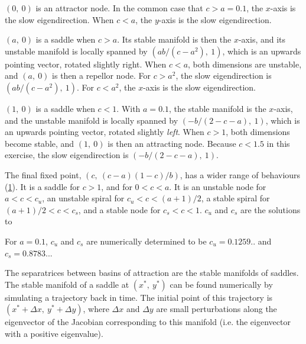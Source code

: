 $(0,\ 0)$ is an attractor node. In the common case that $c > a = 0.1$, the $x$-axis is the slow eigendirection. When $c < a$, the $y$-axis is the slow eigendirection.

$(a,\ 0)$ is a saddle when $c > a$. Its stable manifold is then the $x$-axis, and its unstable manifold is locally spanned by $(ab/(c-a^2),\ 1)$, which is an upwards pointing vector, rotated slightly right. When $c < a$, both dimensions are unstable, and $(a,\ 0)$ is then a repellor node. For $c > a^2$, the slow eigendirection is $(ab/(c-a^2),\ 1)$. For $c < a^2$, the $x$-axis is the slow eigendirection.

$(1,\ 0)$ is a saddle when $c < 1$. With $a = 0.1$, the stable manifold is the $x$-axis, and the unstable manifold is locally spanned by $(-b/(2-c-a),\ 1)$, which is an upwards pointing vector, rotated slightly \emph{left}. When $c > 1$, both dimensions become stable, and $(1,\ 0)$ is then an attracting node. Because $c < 1.5$ in this exercise, the slow eigendirection is $(-b/(2-c-a),\ 1)$.

The final fixed point, $(c,\ (c-a)(1-c)/b)$, has a wider range of behaviours (\cref{fig:eigenheart}). It is a saddle for $c > 1$, and for $0 < c < a$. It is an unstable node for $a < c < c_u$, an unstable spiral for $c_u < c < (a+1)/2$, a stable spiral for $(a+1)/2 < c < c_s$, and a stable node for $c_s < c < 1$. $c_u$ and $c_s$ are the solutions to 

For $a = 0.1$, $c_u$ and $c_s$ are numerically determined to be $c_u = 0.1259..$ and $c_s = 0.8783..$.

\begin{figure}
\label{fig:eigenheart}
\end{figure}

The separatrices between basins of attraction are the stable manifolds of saddles. The stable manifold of a saddle at $(x^*,\ y^*)$ can be found numerically by simulating a trajectory back in time. The initial point of this trajectory is $(x^* + \Delta x,\ y^* + \Delta y)$, where $\Delta x$ and $\Delta y$ are small perturbations along the eigenvector of the Jacobian corresponding to this manifold (i.e. the eigenvector with a positive eigenvalue).


